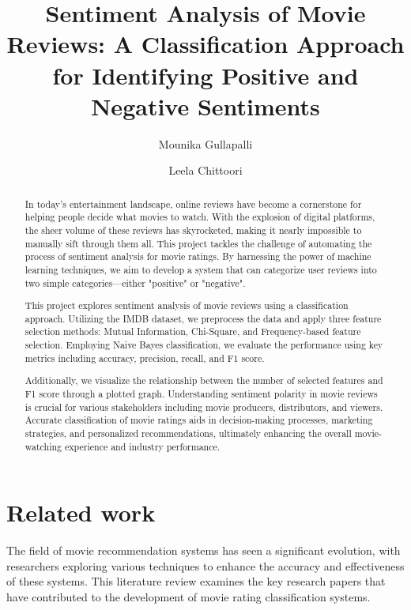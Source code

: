\documentclass[acmlarge,nonacm,12pt]{acmart}
\begin{document}
\title{Sentiment Analysis of Movie Reviews: A Classification Approach for Identifying Positive and Negative Sentiments}

\author{Mounika Gullapalli}
\author{Leela Chittoori}
\authornotemark[1]

\begin{abstract}
In today’s entertainment landscape, online reviews have become a cornerstone for helping people decide what movies to watch. With the explosion of digital platforms, the sheer volume of these reviews has skyrocketed, making it nearly impossible to manually sift through them all. This project tackles the challenge of automating the process of sentiment analysis for movie ratings. By harnessing the power of machine learning techniques, we aim to develop a system that can categorize user reviews into two simple categories—either "positive" or "negative".

This project explores sentiment analysis of movie reviews using a classification approach. Utilizing the IMDB dataset, we preprocess the data and apply three feature selection methods: Mutual Information, Chi-Square, and Frequency-based feature selection. Employing Naive Bayes classification, we evaluate the performance using key metrics including accuracy, precision, recall, and F1 score. 

Additionally, we visualize the relationship between the number of selected features and F1 score through a plotted graph. Understanding sentiment polarity in movie reviews is crucial for various stakeholders including movie producers, distributors, and viewers. Accurate classification of movie ratings aids in decision-making processes, marketing strategies, and personalized recommendations, ultimately enhancing the overall movie-watching experience and industry performance.


\end{abstract}

\maketitle

\section{Related work}
The field of movie recommendation systems has seen a significant evolution, with researchers exploring various techniques to enhance the accuracy and effectiveness of these systems. This literature review examines the key research papers that have contributed to the development of movie rating classification systems.
\end{document}
